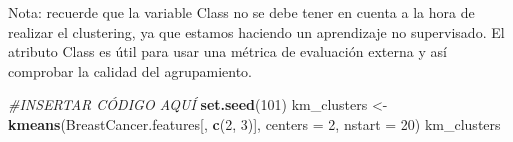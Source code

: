 \documentclass[]{article}
\newenvironment{Shaded}{\begin{snugshade}}{\end{snugshade}}
\newcommand{\CommentTok}[1]{\textcolor[rgb]{0.56,0.35,0.01}{\textit{#1}}}
\newcommand{\DataTypeTok}[1]{\textcolor[rgb]{0.13,0.29,0.53}{#1}}
\newcommand{\DecValTok}[1]{\textcolor[rgb]{0.00,0.00,0.81}{#1}}
\newcommand{\KeywordTok}[1]{\textcolor[rgb]{0.13,0.29,0.53}{\textbf{#1}}}
\newcommand{\NormalTok}[1]{#1}
\newcommand{\StringTok}[1]{\textcolor[rgb]{0.31,0.60,0.02}{#1}}
\begin{document}
Nota: recuerde que la variable Class no se debe tener en cuenta a la
hora de realizar el clustering, ya que estamos haciendo un aprendizaje
no supervisado. El atributo Class es útil para usar una métrica de
evaluación externa y así comprobar la calidad del agrupamiento.

\begin{Shaded}
\begin{Highlighting}[]
\CommentTok{#INSERTAR CÓDIGO AQUÍ}
\KeywordTok{set.seed}\NormalTok{(}\DecValTok{101}\NormalTok{)}
\NormalTok{km_clusters <-}\StringTok{ }\KeywordTok{kmeans}\NormalTok{(BreastCancer.features[, }\KeywordTok{c}\NormalTok{(}\DecValTok{2}\NormalTok{, }\DecValTok{3}\NormalTok{)], }\DataTypeTok{centers =} \DecValTok{2}\NormalTok{, }\DataTypeTok{nstart =} \DecValTok{20}\NormalTok{)}
\NormalTok{km_clusters}
\end{Highlighting}
\end{Shaded}
\end{document}

